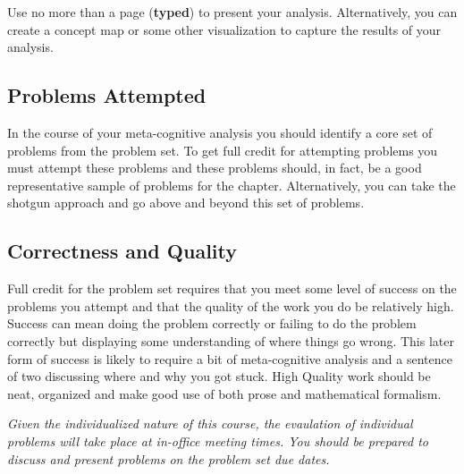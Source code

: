 \documentclass[nobib]{tufte-handout}
\begin{document}
Use no more than a page (\textbf{typed}) to present your analysis. Alternatively, you can create a concept map or some other visualization to capture the results of your analysis.

\subsection*{Problems Attempted}

In the course of your meta-cognitive analysis you should identify a core set of problems from the problem set.  To get full credit for attempting problems you must attempt these problems and these problems should, in fact, be a good representative sample of problems for the chapter. Alternatively, you can take the shotgun approach and go above and beyond this set of problems.

\subsection*{Correctness and Quality}

Full credit for the problem set requires that you meet some level of success on the problems you attempt and that the quality of the work you do be relatively high. Success can mean doing the problem correctly or failing to do the problem correctly but displaying some understanding of where things go wrong.  This later form of success is likely to require a bit of meta-cognitive analysis and a sentence of two discussing where and why you got stuck. High Quality work should be neat, organized and make good use of both prose and mathematical formalism.

\textit{Given the individualized nature of this course, the evaulation of individual problems will take place at in-office meeting times. You should be prepared to discuss and present problems on the problem set due dates.}
\end{document}
